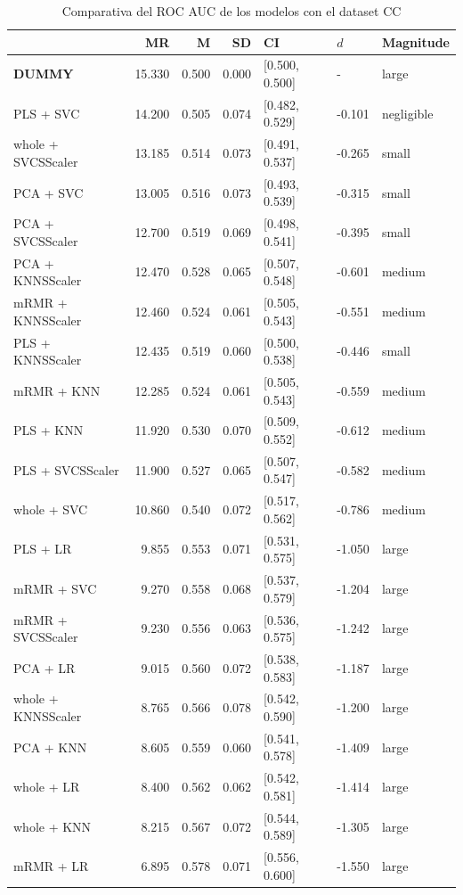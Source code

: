 \documentclass[a4paper,oneside,11pt,leqno]{article}
\begin{document}
	\begin{table}[h]
		\centering
		\begin{tabular}{lrrrlll}
			\toprule
			{} &     MR &     M &    SD &              CI &    $d$ &   Magnitude \\
			\midrule
			 \textbf{DUMMY}              & 15.330 & 0.500 & 0.000 &  [0.500, 0.500] &      - &       large \\
			PLS + SVC          & 14.200 & 0.505 & 0.074 &  [0.482, 0.529] & -0.101 &  negligible \\
			whole + SVCSScaler & 13.185 & 0.514 & 0.073 &  [0.491, 0.537] & -0.265 &       small \\
			PCA + SVC          & 13.005 & 0.516 & 0.073 &  [0.493, 0.539] & -0.315 &       small \\
			PCA + SVCSScaler   & 12.700 & 0.519 & 0.069 &  [0.498, 0.541] & -0.395 &       small \\
			PCA + KNNSScaler   & 12.470 & 0.528 & 0.065 &  [0.507, 0.548] & -0.601 &      medium \\
			mRMR + KNNSScaler  & 12.460 & 0.524 & 0.061 &  [0.505, 0.543] & -0.551 &      medium \\
			PLS + KNNSScaler   & 12.435 & 0.519 & 0.060 &  [0.500, 0.538] & -0.446 &       small \\
			mRMR + KNN         & 12.285 & 0.524 & 0.061 &  [0.505, 0.543] & -0.559 &      medium \\
			PLS + KNN          & 11.920 & 0.530 & 0.070 &  [0.509, 0.552] & -0.612 &      medium \\
			PLS + SVCSScaler   & 11.900 & 0.527 & 0.065 &  [0.507, 0.547] & -0.582 &      medium \\
			whole + SVC        & 10.860 & 0.540 & 0.072 &  [0.517, 0.562] & -0.786 &      medium \\
			PLS + LR           &  9.855 & 0.553 & 0.071 &  [0.531, 0.575] & -1.050 &       large \\
			mRMR + SVC         &  9.270 & 0.558 & 0.068 &  [0.537, 0.579] & -1.204 &       large \\
			mRMR + SVCSScaler  &  9.230 & 0.556 & 0.063 &  [0.536, 0.575] & -1.242 &       large \\
			PCA + LR           &  9.015 & 0.560 & 0.072 &  [0.538, 0.583] & -1.187 &       large \\
			whole + KNNSScaler &  8.765 & 0.566 & 0.078 &  [0.542, 0.590] & -1.200 &       large \\
			PCA + KNN          &  8.605 & 0.559 & 0.060 &  [0.541, 0.578] & -1.409 &       large \\
			whole + LR         &  8.400 & 0.562 & 0.062 &  [0.542, 0.581] & -1.414 &       large \\
			whole + KNN        &  8.215 & 0.567 & 0.072 &  [0.544, 0.589] & -1.305 &       large \\
			mRMR + LR          &  6.895 & 0.578 & 0.071 &  [0.556, 0.600] & -1.550 &       large \\
			\bottomrule
		\end{tabular}
		\caption{Comparativa del ROC AUC de los modelos con el dataset CC}
		\label{tab:stat_results_cc}
	\end{table}
\end{document}
